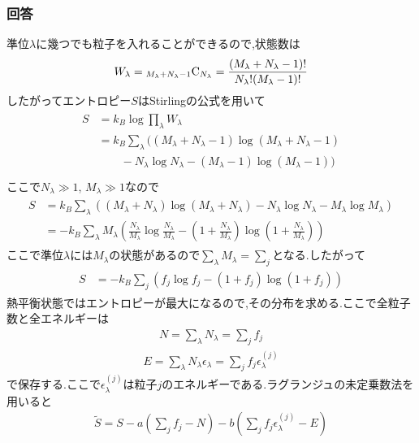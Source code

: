 \documentclass[uplatex,a4j,11pt,dvipdfmx]{jsarticle}
\begin{document}
\subsubsection*{回答}
準位$\lambda$に幾つでも粒子を入れることができるので,状態数は
\begin{align}
  W_\lambda={}_{M_\lambda+N_\lambda-1}{\rm C}_{N_\lambda}=\frac{(M_\lambda+N_\lambda-1)!}{N_\lambda!(M_\lambda-1)!}
\end{align}
したがってエントロピー$S$はStirlingの公式を用いて
\begin{align}
  \begin{split}
    S&=k_B\log\prod_\lambda W_\lambda\\
    &=k_B\sum_\lambda((M_\lambda+N_\lambda-1)\log(M_\lambda+N_\lambda-1)\\
    &\qquad-N_\lambda\log N_\lambda-(M_\lambda-1)\log(M_\lambda-1))\\
  \end{split}
\end{align}
ここで$N_\lambda\gg1$, $M_\lambda\gg1$なので
\begin{align}
  \begin{split}
    S&=k_B\sum_\lambda((M_\lambda+N_\lambda)\log(M_\lambda+N_\lambda)-N_\lambda\log N_\lambda-M_\lambda\log M_\lambda)\\
    &=-k_B\sum_\lambda M_\lambda\left(\frac{N_\lambda}{M_\lambda}\log\frac{N_\lambda}{M_\lambda}-\left(1+\frac{N_\lambda}{M_\lambda}\right)\log\left(1+\frac{N_\lambda}{M_\lambda}\right)\right)
  \end{split}
\end{align}
ここで準位$\lambda$には$M_\lambda$の状態があるので$\sum_\lambda M_\lambda=\sum_j$となる.したがって
\begin{align}
  \begin{split}
    S&=-k_B\sum_j\left(f_j\log f_j-(1+f_j)\log(1+f_j)\right)
  \end{split}
\end{align}
熱平衡状態ではエントロピーが最大になるので,その分布を求める.ここで全粒子数と全エネルギーは
\begin{align}
  N=\sum_\lambda N_\lambda=\sum_jf_j
\end{align}
\begin{align}
  E=\sum_\lambda N_\lambda\epsilon_\lambda=\sum_jf_j\epsilon_\lambda^{(j)}
\end{align}
で保存する.ここで$\epsilon_\lambda^{(j)}$は粒子$j$のエネルギーである.ラグランジュの未定乗数法を用いると
\begin{align}
  \tilde{S}=S-a\left(\sum_jf_j-N\right)-b\left(\sum_jf_j\epsilon_\lambda^{(j)}-E\right)
\end{align}
\end{document}
